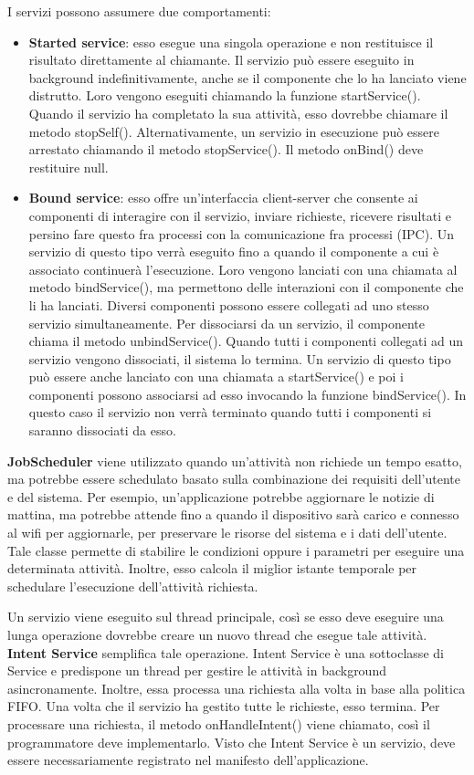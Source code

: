 I servizi possono assumere due comportamenti:
\begin{itemize}
    \item \textbf{Started service}: esso esegue una singola operazione e non restituisce il risultato direttamente al chiamante. Il servizio può essere eseguito in background indefinitivamente, anche se il componente che lo ha lanciato viene distrutto. Loro vengono eseguiti chiamando la funzione startService(). Quando il servizio ha completato la sua attività, esso dovrebbe chiamare il metodo stopSelf(). Alternativamente, un servizio in esecuzione può essere arrestato chiamando il metodo stopService(). Il metodo onBind() deve restituire null.
    \item \textbf{Bound service}: esso offre un'interfaccia client-server che consente ai componenti di interagire con il servizio, inviare richieste, ricevere risultati e persino fare questo fra processi con la comunicazione fra processi (IPC). Un servizio di questo tipo verrà eseguito fino a quando il componente a cui è associato continuerà l'esecuzione. Loro vengono lanciati con una chiamata al metodo bindService(), ma permettono delle interazioni con il componente che li ha lanciati. Diversi componenti possono essere collegati ad uno stesso servizio simultaneamente. Per dissociarsi da un servizio, il componente chiama il metodo unbindService(). Quando tutti i componenti collegati ad un servizio vengono dissociati, il sistema lo termina. Un servizio di questo tipo può essere anche lanciato con una chiamata a startService() e poi i componenti possono associarsi ad esso invocando la funzione bindService(). In questo caso il servizio non verrà terminato quando tutti i componenti si saranno dissociati da esso.
\end{itemize}

\textbf{JobScheduler} viene utilizzato quando un'attività non richiede un tempo esatto, ma potrebbe essere schedulato basato sulla combinazione dei requisiti dell'utente e del sistema.
Per esempio, un'applicazione potrebbe aggiornare le notizie di mattina, ma potrebbe attende fino a quando il dispositivo sarà carico e connesso al wifi per aggiornarle, per preservare le risorse del sistema e i dati dell'utente. Tale classe permette di stabilire le condizioni oppure i parametri per eseguire una determinata attività. Inoltre, esso calcola il miglior istante temporale per schedulare l'esecuzione dell'attività richiesta.

Un servizio viene eseguito sul thread principale, così se esso deve eseguire una lunga operazione dovrebbe creare un nuovo thread che esegue tale attività.
\textbf{Intent Service} semplifica tale operazione. Intent Service è una sottoclasse di Service e predispone un thread per gestire le attività in background asincronamente.
Inoltre, essa processa una richiesta alla volta in base alla politica FIFO.
Una volta che il servizio ha gestito tutte le richieste, esso termina. Per processare una richiesta, il metodo onHandleIntent() viene chiamato, così il programmatore deve implementarlo.
Visto che Intent Service è un servizio, deve essere necessariamente registrato nel manifesto dell'applicazione.

